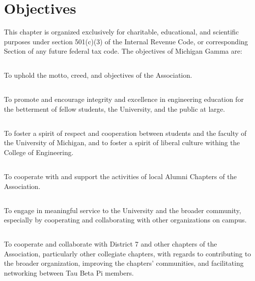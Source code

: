 \chapter{Objectives}\label{sec:objectives}

This chapter is organized exclusively for charitable, educational, and scientific purposes under section 501(c)(3) of the Internal Revenue Code, or corresponding Section of any future federal tax code.
The objectives of  Michigan Gamma are:

\section{}
To uphold the motto, creed, and objectives of the Association.

\section{}
To promote and encourage integrity and excellence in engineering education for the betterment of fellow students, the University, and the public at large.

\section{}
To foster a spirit of respect and cooperation between students and the faculty of the University of Michigan, and to foster a spirit of liberal culture withing the College of Engineering.

\section{}
To cooperate with and support the activities of local Alumni Chapters of the Association.%

\section{}
To engage in meaningful service to the University and the broader community, especially by cooperating and collaborating with other organizations on campus.

\section{}
To cooperate and collaborate with District 7 and other chapters of the Association, particularly other collegiate chapters, with regards to contributing to the broader organization, improving the chapters' communities, and facilitating networking between Tau Beta Pi members.

